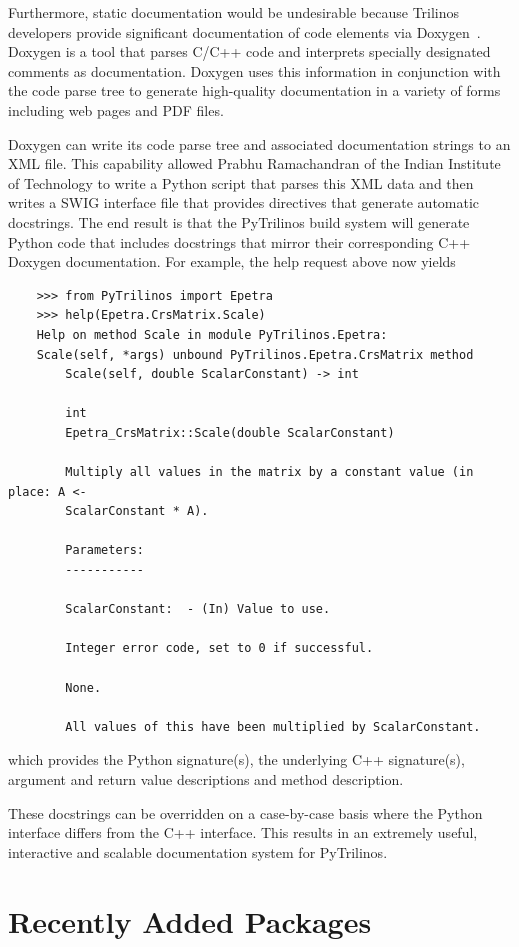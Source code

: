 \documentclass[11pt]{article}
\begin{document}
Furthermore, static documentation would be undesirable because Trilinos developers provide significant documentation of code elements via Doxygen~\cite{Doxygen}.  Doxygen is a tool that parses C/C++ code and interprets specially designated comments as documentation.  Doxygen uses this information in conjunction with the code parse tree to generate high-quality documentation in a variety of forms including web pages and PDF files.

Doxygen can write its code parse tree and associated documentation strings to an XML file.  This capability allowed Prabhu Ramachandran of the Indian Institute of Technology to write a Python script that parses this XML data and then writes a SWIG interface file that provides directives that generate automatic docstrings.  The end result is that the PyTrilinos build system will generate Python code that includes docstrings that mirror their corresponding C++ Doxygen documentation.  For example, the help request above now yields

\begin{verbatim}
    >>> from PyTrilinos import Epetra
    >>> help(Epetra.CrsMatrix.Scale)
    Help on method Scale in module PyTrilinos.Epetra:
    Scale(self, *args) unbound PyTrilinos.Epetra.CrsMatrix method
        Scale(self, double ScalarConstant) -> int
    
        int
        Epetra_CrsMatrix::Scale(double ScalarConstant)

        Multiply all values in the matrix by a constant value (in place: A <-
        ScalarConstant * A).

        Parameters:
        -----------

        ScalarConstant:  - (In) Value to use.

        Integer error code, set to 0 if successful.

        None.

        All values of this have been multiplied by ScalarConstant.
\end{verbatim}

which provides the Python signature(s), the underlying C++ signature(s), argument and return value descriptions and method description.

These docstrings can be overridden on a case-by-case basis where the Python interface differs from the C++ interface.  This results in an extremely useful, interactive and scalable documentation system for PyTrilinos.

\section{Recently Added Packages}
\label{sec:newpackages}
\end{document}
